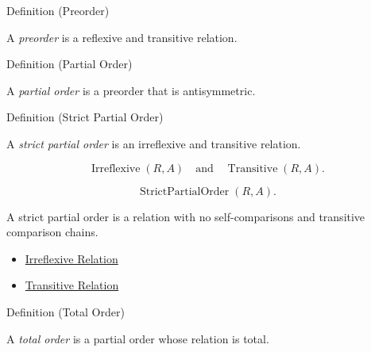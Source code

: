\begin{topicbox}{Definition (Preorder)}
\begin{exposition}
A \emph{preorder} is a reflexive and transitive relation.
\end{exposition}
\end{topicbox}

\begin{topicbox}{Definition (Partial Order)}
\begin{exposition}
A \emph{partial order} is a preorder that is antisymmetric.
\end{exposition}
\end{topicbox}

\begin{definitionbox}{Definition (Strict Partial Order)}
\begin{definition}
\label{def:strict-partial-order}
A \emph{strict partial order} is an irreflexive and transitive relation.
\end{definition}
\end{definitionbox}

\begin{remark*}
\[
\operatorname{Irreflexive}(R,A)
\quad\text{and}\quad
\operatorname{Transitive}(R,A).
\]
\end{remark*}

\begin{remark*}
\[
\operatorname{StrictPartialOrder}(R,A).
\]
\end{remark*}

\begin{remark*}[Interpretation]
A strict partial order is a relation with no self-comparisons and transitive
comparison chains.
\end{remark*}

\begin{dependencies}
\begin{itemize}
  \item \hyperref[def:irreflexive-relation]{Irreflexive Relation}
  \item \hyperref[def:transitive-relation]{Transitive Relation}
\end{itemize}
\end{dependencies}

\begin{topicbox}{Definition (Total Order)}
\begin{exposition}
A \emph{total order} is a partial order whose relation is total.
\end{exposition}
\end{topicbox}

